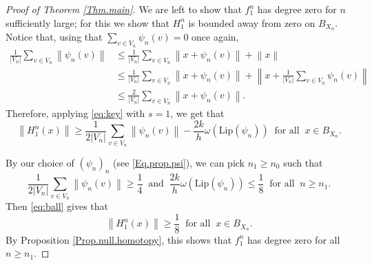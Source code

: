 \documentclass[11pt]{amsart}
\newcommand{\Lip}{\mathrm{Lip}}
\theoremstyle{definition}
\theoremstyle{remark}
\newcommand{\norm}[1]{\left\lVert #1 \right\rVert}
\begin{document}
\begin{proof}[Proof of Theorem \ref{Thm.main}]
We are  left to show that  $f^n_1$ has degree zero for $n$ sufficiently large; for this we show that $H^n_1$ is bounded away from zero on $B_{X_n}$. Notice that, using that $\sum_{v\in V_n} \psi_n(v)=0$ once again,
\begin{align*}
  \frac{1}{|V_n|}\sum_{v\in V_n}\norm{\psi_n(v)} & \leq\frac{1}{|V_n|}\sum_{v\in V_n}\norm{x+\psi_n(v)}+\norm{x}\\
  &\leq\frac{1}{|V_n|}\sum_{v\in V_n}\norm{x+\psi_n(v)}+\norm{x+\frac{1}{|V_n|}\sum_{v\in V_n}\psi_n(v)}\\
 &\leq  \frac{2}{|V_n|}\sum_{v\in V_n}\norm{x+\psi_n(v)}.
\end{align*}
Therefore, applying  \eqref{eq:key} with $s=1$, we get that 
\begin{equation}
 \norm{H^n_1(x)}\geq  \frac{1}{2|V_n|}\sum_{v\in V_n}\norm{\psi_n(v)}-\frac{2k}{h}\omega\left(\Lip(\psi_n)\right)\ \text{ for all }\ x\in B_{X_n}.
  \label{eq:ball}
\end{equation}

By our choice of $(\psi_n)_n$ (see \eqref{Eq.prop.psi}), we can pick  $n_1\geq n_0$ such that
\[\frac{1}{2|V_n|}\sum_{v\in V_n}\norm{\psi_n(v)}\geq \frac{1}{4}\ \text{ and }\ \frac{2k}{h}\omega\left(\Lip(\psi_n)\right)\leq\frac{1}{8}\ \text{ for all } \ n\geq n_1.\]
Then  \eqref{eq:ball} gives that 
\begin{equation*}
 \norm{H^n_1(x)}\geq\frac{1}{8}\ \text{ for all }\ x\in B_{X_n}.
\end{equation*}
By Proposition \ref{Prop.null.homotopy}, this shows that $f^n_1$ has degree zero for all $n\geq n_1$.\end{proof}


\end{document}
